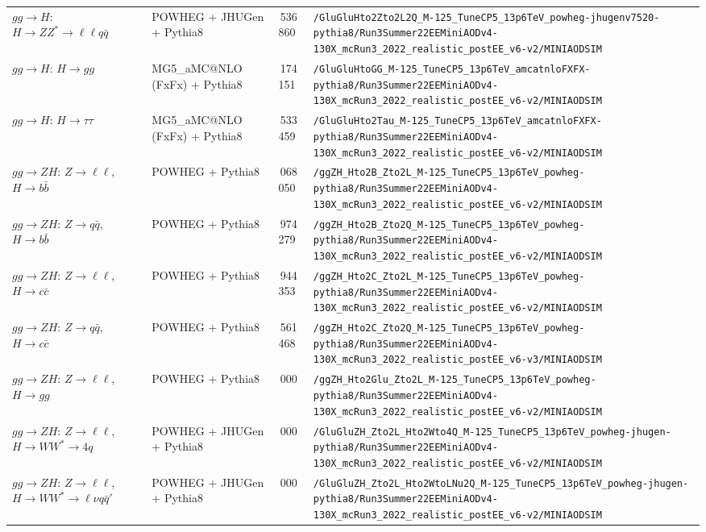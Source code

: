 \begin{landscape}
\begin{longtable}{@{}>{\raggedright\arraybackslash}p{3.2cm}>{\raggedright\arraybackslash}p{3.6cm}>{\raggedleft\arraybackslash}p{1.6cm}>{\raggedright\arraybackslash}p{13.5cm}@{}}
$gg\to H$: $H\to ZZ^*\to\ell\ell q\bar q$ & POWHEG + JHUGen + Pythia8 & 1\,536\,860 & \nolinkurl{/GluGluHto2Zto2L2Q_M-125_TuneCP5_13p6TeV_powheg-jhugenv7520-pythia8/Run3Summer22EEMiniAODv4-130X_mcRun3_2022_realistic_postEE_v6-v2/MINIAODSIM} \\
$gg\to H$: $H\to gg$ & MG5\_aMC@NLO (FxFx) + Pythia8 & 3\,174\,151 & \nolinkurl{/GluGluHtoGG_M-125_TuneCP5_13p6TeV_amcatnloFXFX-pythia8/Run3Summer22EEMiniAODv4-130X_mcRun3_2022_realistic_postEE_v6-v2/MINIAODSIM} \\
$gg\to H$: $H\to \tau\tau$ & MG5\_aMC@NLO (FxFx) + Pythia8 & 3\,533\,459 & \nolinkurl{/GluGluHto2Tau_M-125_TuneCP5_13p6TeV_amcatnloFXFX-pythia8/Run3Summer22EEMiniAODv4-130X_mcRun3_2022_realistic_postEE_v6-v2/MINIAODSIM} \\
$gg\to ZH$: $Z\to \ell\ell$, $H\to b\bar b$ & POWHEG + Pythia8 & 2\,068\,050 & \nolinkurl{/ggZH_Hto2B_Zto2L_M-125_TuneCP5_13p6TeV_powheg-pythia8/Run3Summer22EEMiniAODv4-130X_mcRun3_2022_realistic_postEE_v6-v2/MINIAODSIM} \\
$gg\to ZH$: $Z\to q\bar q$, $H\to b\bar b$ & POWHEG + Pythia8 & 1\,974\,279 & \nolinkurl{/ggZH_Hto2B_Zto2Q_M-125_TuneCP5_13p6TeV_powheg-pythia8/Run3Summer22EEMiniAODv4-130X_mcRun3_2022_realistic_postEE_v6-v2/MINIAODSIM} \\
$gg\to ZH$: $Z\to \ell\ell$, $H\to c\bar c$ & POWHEG + Pythia8 & 2\,944\,353 & \nolinkurl{/ggZH_Hto2C_Zto2L_M-125_TuneCP5_13p6TeV_powheg-pythia8/Run3Summer22EEMiniAODv4-130X_mcRun3_2022_realistic_postEE_v6-v2/MINIAODSIM} \\
$gg\to ZH$: $Z\to q\bar q$, $H\to c\bar c$ & POWHEG + Pythia8 & 15\,561\,468 & \nolinkurl{/ggZH_Hto2C_Zto2Q_M-125_TuneCP5_13p6TeV_powheg-pythia8/Run3Summer22EEMiniAODv4-130X_mcRun3_2022_realistic_postEE_v6-v3/MINIAODSIM} \\
$gg\to ZH$: $Z\to \ell\ell$, $H\to gg$ & POWHEG + Pythia8 & 100\,000 & \nolinkurl{/ggZH_Hto2Glu_Zto2L_M-125_TuneCP5_13p6TeV_powheg-pythia8/Run3Summer22EEMiniAODv4-130X_mcRun3_2022_realistic_postEE_v6-v2/MINIAODSIM} \\
$gg\to ZH$: $Z\to \ell\ell$, $H\to WW^*\to 4q$ & POWHEG + JHUGen + Pythia8 & 990\,000 & \nolinkurl{/GluGluZH_Zto2L_Hto2Wto4Q_M-125_TuneCP5_13p6TeV_powheg-jhugen-pythia8/Run3Summer22EEMiniAODv4-130X_mcRun3_2022_realistic_postEE_v6-v2/MINIAODSIM} \\
$gg\to ZH$: $Z\to \ell\ell$, $H\to WW^*\to\ell\nu q\bar q'$ & POWHEG + JHUGen + Pythia8 & 999\,000 & \nolinkurl{/GluGluZH_Zto2L_Hto2WtoLNu2Q_M-125_TuneCP5_13p6TeV_powheg-jhugen-pythia8/Run3Summer22EEMiniAODv4-130X_mcRun3_2022_realistic_postEE_v6-v2/MINIAODSIM} \\

\end{longtable}
\end{landscape}
